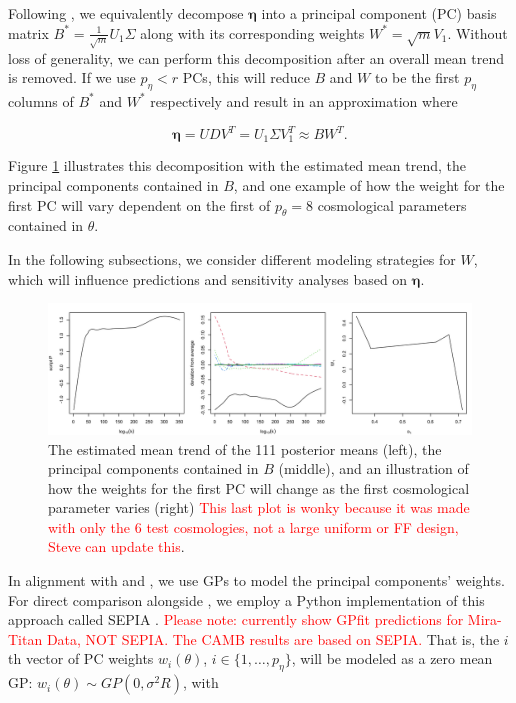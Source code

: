 \documentclass[11pt]{article}
\begin{document}
Following \cite{higdon2008computer, higdon2010estcosmo}, we equivalently decompose 
$\boldsymbol\eta$ into a principal component (PC) basis matrix 
$B^* = \frac{1}{\sqrt{m}}U_1\Sigma$ along with its corresponding weights 
$W^* = \sqrt{m}V_1$. Without loss of generality, we can perform this decomposition 
after an overall mean trend is removed. If we use $p_\eta < r$ PCs, this will reduce 
$B$ and $W$ to be the first $p_\eta$ columns of $B^*$ and $W^*$ respectively and 
result in an approximation where 

\begin{equation}
    \boldsymbol\eta= UDV^T = U_1\Sigma V_1^T \approx BW^T.
\end{equation}

Figure \ref{fig:mean_PCs_oneW} illustrates this decomposition with the estimated 
mean trend, the principal components contained in $B$, and one example of how the 
weight for the first PC will vary dependent on the first of $p_\theta=8$ cosmological 
parameters contained in $\theta$.

In the following subsections, we consider different modeling strategies for $W$, 
which will influence predictions and sensitivity analyses based on $\boldsymbol\eta$.

\begin{figure}
    \centering
    \includegraphics[width=\textwidth]{mean_PCs_oneW.png}
    \caption{The estimated mean trend of the 111 posterior means (left), the principal 
    components contained in $B$ (middle), and an illustration of how the weights 
    for the first PC will change as the first cosmological parameter varies (right) 
    \textcolor{red}{This last plot is wonky because it was made with only the 6 test 
    cosmologies, not a large uniform or FF design, Steve can update this}.}
    \label{fig:mean_PCs_oneW}
\end{figure}



In alignment with \cite{heitmann2009coyote} and \cite{higdon2010estcosmo}, we use 
GPs to model the principal components' weights. For direct comparison alongside
\cite{moran2023mira}, we employ a Python implementation of this approach called 
SEPIA \citep{gattiker2020sepia}. \textcolor{red}{Please note: currently show GPfit 
predictions for Mira-Titan Data, NOT SEPIA. The CAMB results are based on SEPIA.}
That is, the $i$th vector of PC weights $w_i(\theta)$, 
$i \in \{1,\ldots,p_\eta\}$, will be modeled as a zero mean GP: 
$w_i(\theta) \sim GP(0, \sigma^2R)$, with
\end{document}
